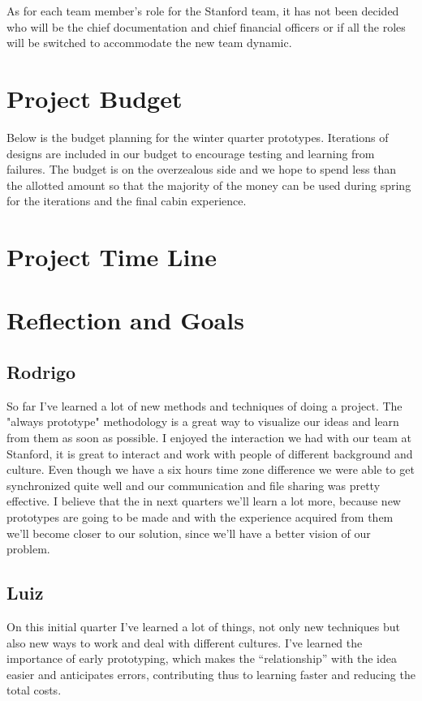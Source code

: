 As for each team member’s role for the Stanford team, it has not been decided who will be the chief documentation and chief financial officers or if all the roles will be switched to accommodate the new team dynamic. 

\section{Project Budget}
Below is the budget planning for the winter quarter prototypes.  Iterations of designs are included in our budget to encourage testing and learning from failures. The budget is on the overzealous side and we hope to spend less than the allotted amount so that the majority of the money can be used during spring for the iterations and the final cabin experience. 

\section{Project Time Line}
\section{Reflection and Goals}
\subsection{Rodrigo}
So far I’ve learned a lot of new methods and techniques of doing a project. The "always prototype" methodology is a great way to visualize our ideas and learn from them as soon as possible.
I enjoyed the interaction we had with our team at Stanford, it is great to interact and work with people of different background and culture. Even though we have a six hours time zone difference we were able to get synchronized quite well and our communication and file sharing was pretty effective.
I believe that the in next quarters we'll learn a lot more, because new prototypes are going to be made and with the experience acquired from them we'll become closer to our solution, since we'll have a better vision of our problem.

\subsection{Luiz}
On this initial quarter I’ve learned a lot of things, not only new techniques but also new ways to work and deal with different cultures. I’ve learned the importance of early prototyping, which makes the “relationship” with the idea easier and anticipates errors, contributing thus to learning faster and reducing the total costs.

